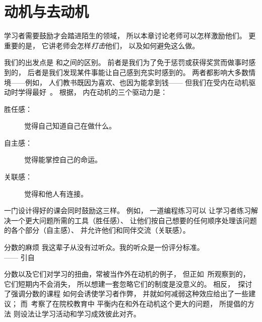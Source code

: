 \chapter{动机与去动机}\label{s:motivation}

学习者需要鼓励才会踏进陌生的领域，
所以本章讨论老师可以怎样激励他们。
更重要的是，
它讲老师会怎样\emph{打击}他们，
以及如何避免这么做。

我们的出发点是
和之间的区别。
前者是我们为了免于惩罚或获得奖赏而做事时感到的，
后者是我们发现某件事能让自己感到充实时感到的。
两者都影响大多数情境——例如，
人们教书既因为喜欢、也因为能拿到钱——
但我们在受内在动机驱动时学得最好~\cite{Wlod2017}。
根据，
内在动机的三个驱动力是：

\begin{description}

\item[胜任感：]
  觉得自己知道自己在做什么。

\item[自主感：]
  觉得能掌控自己的命运。

\item[关联感：]
  觉得和他人有连接。

\end{description}

一门设计得好的课会同时鼓励这三样。
例如，
一道编程练习可以
让学习者练习解决一个更大问题所需的工具（胜任感）、
让他们按自己想要的任何顺序处理该问题的各个部分（自主感）、
并允许他们和同伴交流（关联感）。

\begin{aside}{分数的麻烦}
  我这辈子从没有过听众。我的听众是一份评分标准。\\
  —— 引自

  分数以及它们对学习的扭曲，常被当作外在动机的例子，
  但正如~\cite{Mill2016a}所观察到的，
  它们短期内不会消失，
  所以想建一套忽略它们的制度是没意义的。
  相反，~\cite{Lang2013}探讨了强调分数的课程
  如何会诱使学习者作弊，
  并就如何减弱这种效应给出了一些建议；
  而~\cite{Covi2017}考察了在院校教育中
  平衡内在和外在动机这个更大的问题，
  \cite{Bigg2011}所提倡的方法
  则设法让学习活动和学习成效彼此对齐。
\end{aside}

